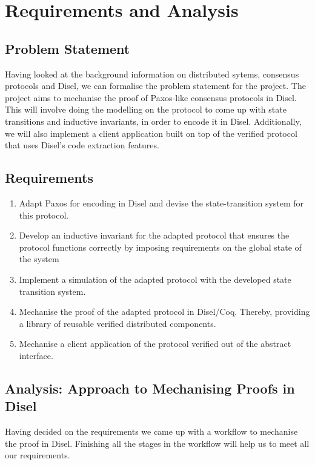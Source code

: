 \chapter{Requirements and Analysis}

\section{Problem Statement}
Having looked at the background information on distributed sytems, consensus protocols
and Disel, we can formalise the problem statement for the project.
The project aims to mechanise the proof of Paxos-like consensus protocols in
Disel. This will involve doing the modelling on the protocol to come up with
state transitions and inductive invariants, in order to encode it in Disel.
Additionally, we will also implement a client application built on top
of the verified protocol that uses Disel's code extraction features.

\section{Requirements}
\begin{enumerate}
  \item Adapt Paxos for encoding in Disel and devise the state-transition system for this protocol.
  \item Develop an inductive invariant for the adapted protocol that
    ensures the protocol functions correctly by imposing requirements on the global state of the system
  \item Implement a simulation of the adapted protocol with the developed state transition system.
  \item Mechanise the proof of the adapted protocol in Disel/Coq.
    Thereby, providing a library of reusable verified distributed components.
  \item Mechanise a client application of the protocol verified out of the abstract interface.
\end{enumerate}

\vspace{-5mm}
\section{Analysis: Approach to Mechanising Proofs in Disel}
Having decided on the requirements we came up with a workflow to
mechanise the proof in Disel. Finishing all the stages in the workflow
will help us to meet all our requirements.

